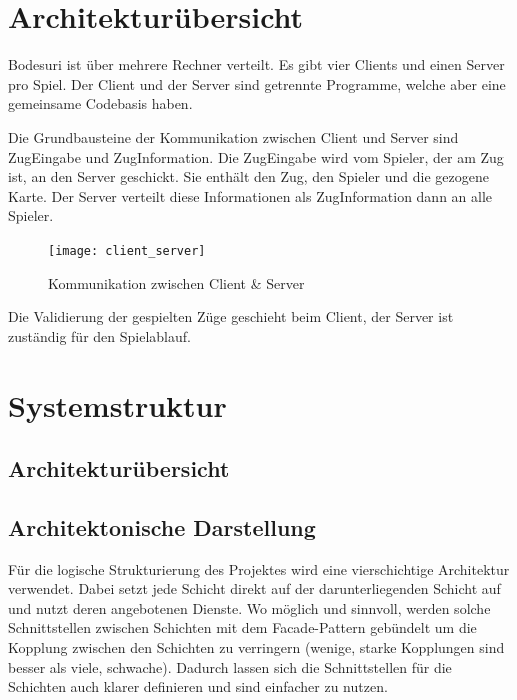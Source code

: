 \documentclass[a4paper,12pt,halfparskip,DIV12]{scrartcl}
\begin{document}


\section{Architekturübersicht} %
\label{sec:architekturübersicht}
Bodesuri ist über mehrere Rechner verteilt. Es gibt vier Clients und einen Server pro Spiel. Der Client und der Server sind getrennte Programme, welche aber eine gemeinsame Codebasis haben.

Die Grundbausteine der Kommunikation zwischen Client und Server sind ZugEingabe und ZugInformation. Die ZugEingabe wird vom Spieler, der am Zug ist, an den Server geschickt. Sie enthält den Zug, den Spieler und die gezogene Karte. Der Server verteilt diese Informationen als ZugInformation dann an alle Spieler.

\begin{figure}[h]
	\centering
	\texttt{[image: client\_server]}
	\caption{Kommunikation zwischen Client \& Server}
	\label{fig:client_server}
\end{figure}

Die Validierung der gespielten Züge geschieht beim Client, der Server ist zuständig für den Spielablauf.

\section{Systemstruktur} %
\label{Systemstruktur}

\subsection{Architekturübersicht} %
\label{sub:architekturuebersicht}
\subsection{Architektonische Darstellung} %
\label{sub:architektonische_darstellung}
Für die logische Strukturierung des Projektes wird eine vierschichtige Architektur verwendet. Dabei setzt jede Schicht direkt auf der darunterliegenden Schicht auf und nutzt deren angebotenen Dienste. Wo möglich und sinnvoll, werden solche Schnittstellen zwischen Schichten mit dem Facade-Pattern gebündelt um die Kopplung zwischen den Schichten zu verringern (wenige, starke Kopplungen sind besser als viele, schwache). Dadurch lassen sich die Schnittstellen für die Schichten auch klarer definieren und sind einfacher zu nutzen.
\end{document}
